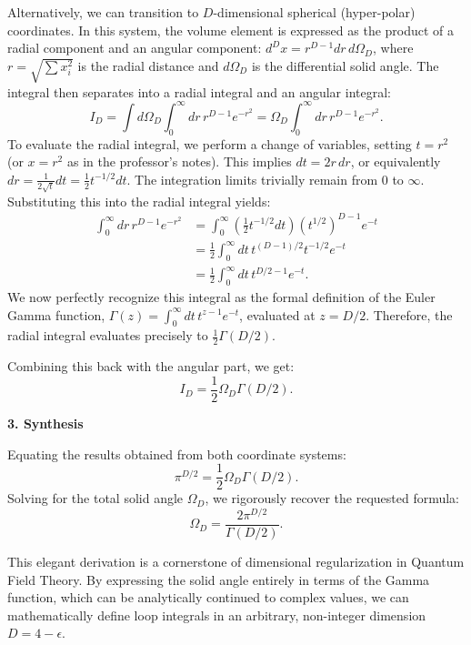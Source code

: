 Alternatively, we can transition to $D$-dimensional spherical (hyper-polar) coordinates. In this system, the volume element is expressed as the product of a radial component and an angular component: $d^Dx = r^{D-1} dr \, d\Omega_D$, where $r = \sqrt{\sum x_i^2}$ is the radial distance and $d\Omega_D$ is the differential solid angle. The integral then separates into a radial integral and an angular integral:
\[
    I_D = \int d\Omega_D \int_0^\infty dr \, r^{D-1} e^{-r^2} = \Omega_D \int_0^\infty dr \, r^{D-1} e^{-r^2}.
\]
To evaluate the radial integral, we perform a change of variables, setting $t = r^2$ (or $x = r^2$ as in the professor's notes). This implies $dt = 2r \, dr$, or equivalently $dr = \frac{1}{2\sqrt{t}} dt = \frac{1}{2} t^{-1/2} dt$. The integration limits trivially remain from $0$ to $\infty$. Substituting this into the radial integral yields:
\[
    \begin{aligned}
        \int_0^\infty dr \, r^{D-1} e^{-r^2} & = \int_0^\infty \left( \frac{1}{2} t^{-1/2} dt \right) (t^{1/2})^{D-1} e^{-t} \\
                                             & = \frac{1}{2} \int_0^\infty dt \, t^{(D-1)/2} t^{-1/2} e^{-t}                 \\
                                             & = \frac{1}{2} \int_0^\infty dt \, t^{D/2 - 1} e^{-t}.
    \end{aligned}
\]
We now perfectly recognize this integral as the formal definition of the Euler Gamma function, $\Gamma(z) = \int_0^\infty dt \, t^{z-1} e^{-t}$, evaluated at $z = D/2$. Therefore, the radial integral evaluates precisely to $\frac{1}{2}\Gamma(D/2)$.

Combining this back with the angular part, we get:
\[
    I_D = \frac{1}{2} \Omega_D \Gamma(D/2).
\]

\textbf{3. Synthesis}

Equating the results obtained from both coordinate systems:
\[
    \pi^{D/2} = \frac{1}{2} \Omega_D \Gamma(D/2).
\]
Solving for the total solid angle $\Omega_D$, we rigorously recover the requested formula:
\[
    \Omega_D = \frac{2\pi^{D/2}}{\Gamma(D/2)}.
\]

\begin{remark}
    This elegant derivation is a cornerstone of dimensional regularization in Quantum Field Theory. By expressing the solid angle entirely in terms of the Gamma function, which can be analytically continued to complex values, we can mathematically define loop integrals in an arbitrary, non-integer dimension $D = 4 - \epsilon$.
\end{remark}


